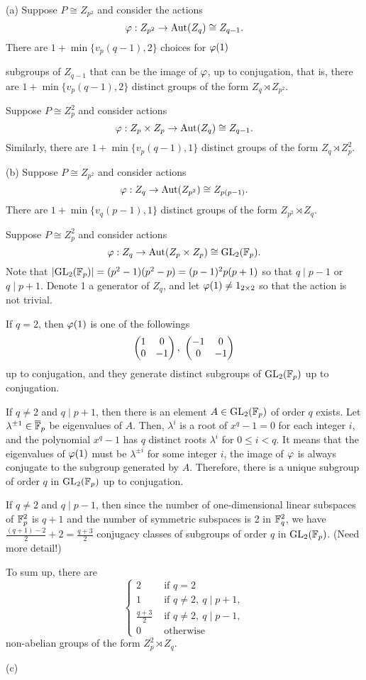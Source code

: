 \documentclass{../note}
\begin{document}
\begin{pf}
(a)
Suppose $P\cong Z_{p^2}$ and consider the actions
\[\varphi:Z_{p^2}\to\operatorname{Aut}(Z_q)\cong Z_{q-1}.\]
There are $1+\min\{v_p(q-1),2\}$ choices for $\varphi(1)$

subgroups of $Z_{q-1}$ that can be the image of $\varphi$, up to conjugation, that is, there are $1+\min\{v_p(q-1),2\}$ distinct groups of the form $Z_q\rtimes Z_{p^2}$.

Suppose $P\cong Z_p^2$ and consider actions
\[\varphi:Z_p\times Z_p\to\operatorname{Aut}(Z_q)\cong Z_{q-1}.\]
Similarly, there are $1+\min\{v_p(q-1),1\}$ distinct groups of the form $Z_q\rtimes Z_p^2$.

(b)
Suppose $P\cong Z_{p^2}$ and consider actions
\[\varphi:Z_q\to\operatorname{Aut}(Z_{p^2})\cong Z_{p(p-1)}.\]
There are $1+\min\{v_q(p-1),1\}$ distinct groups of the form $Z_{p^2}\rtimes Z_q$.

Suppose $P\cong Z_p^2$ and consider actions
\[\varphi:Z_q\to\operatorname{Aut}(Z_p\times Z_p)\cong\mathrm{GL}_2(\mathbb{F}_p).\]
Note that $|\mathrm{GL}_2(\mathbb{F}_p)|=(p^2-1)(p^2-p)=(p-1)^2p(p+1)$ so that $q\mid p-1$ or $q\mid p+1$.
Denote 1 a generator of $Z_q$, and let $\varphi(1)\ne1_{2\times2}$ so that the action is not trivial.

If $q=2$, then $\varphi(1)$ is one of the followings
\[\mat{1&0\\0&-1},\ \mat{-1&0\\0&-1}\]
up to conjugation, and they generate distinct subgroups of $\mathrm{GL}_2(\mathbb{F}_p)$ up to conjugation.

If $q\ne2$ and $q\mid p+1$, then there is an element $A\in\mathrm{GL}_2(\mathbb{F}_p)$ of order $q$ exists.
Let $\lambda^{\pm1}\in\overline{\mathbb{F}}_p$ be eigenvalues of $A$.
Then, $\lambda^i$ is a root of $x^q-1=0$ for each integer $i$, and the polynomial $x^q-1$ has $q$ distinct roots $\lambda^i$ for $0\le i<q$.
It means that the eigenvalues of $\varphi(1)$ must be $\lambda^{\pm i}$ for some integer $i$, the image of $\varphi$ is always conjugate to the subgroup generated by $A$.
Therefore, there is a unique subgroup of order $q$ in $\mathrm{GL}_2(\mathbb{F}_p)$ up to conjugation.

If $q\ne2$ and $q\mid p-1$, then since the number of one-dimensional linear subspaces of $\mathbb{F}_p^2$ is $q+1$ and the number of symmetric subspaces is 2 in $\mathbb{F}_q^2$, we have $\frac{(q+1)-2}2+2=\frac{q+3}2$ conjugacy classes of subgroups of order $q$ in $\mathrm{GL}_2(\mathbb{F}_p)$. (Need more detail!)

To sum up, there are
\[\begin{cases}
2&\text{ if }q=2\\
1&\text{ if }q\ne2,\ q\mid p+1,\\
\frac{q+3}2&\text{ if }q\ne2,\ q\mid p-1,\\
0&\text{ otherwise }\end{cases}\]
non-abelian groups of the form $Z_p^2\rtimes Z_q$.


(c)

\end{pf}
\end{document}
